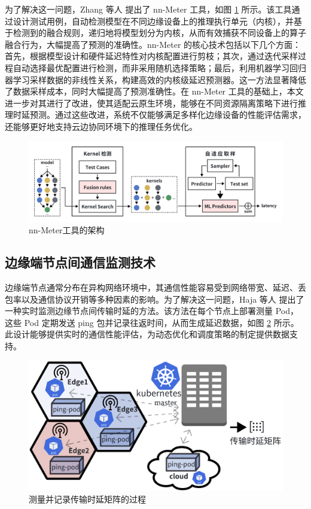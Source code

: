 为了解决这一问题，Zhang 等人\cite{zhang2021nn} 提出了 nn-Meter 工具，如图 \ref{fig:2-5nnmeter} 所示。该工具通过设计测试用例，自动检测模型在不同边缘设备上的推理执行单元（内核），并基于检测到的融合规则，递归地将模型划分为内核，从而有效捕获不同设备上的算子融合行为，大幅提高了预测的准确性。nn-Meter 的核心技术包括以下几个方面：首先，根据模型设计和硬件延迟特性对内核配置进行剪枝；其次，通过迭代采样过程自动选择最优配置进行检测，而非采用随机选择策略；最后，利用机器学习回归器学习采样数据的非线性关系，构建高效的内核级延迟预测器。这一方法显著降低了数据采样成本，同时大幅提高了预测准确性。在 nn-Meter 工具的基础上，本文进一步对其进行了改进，使其适配云原生环境，能够在不同资源隔离策略下进行推理时延预测。通过这些改进，系统不仅能够满足多样化边缘设备的性能评估需求，还能够更好地支持云边协同环境下的推理任务优化。

\begin{figure}[ht]
  \centering
  \includegraphics[width=\linewidth]{pics/2-5nnmeter.png}
  \caption{nn-Meter工具的架构}
  \label{fig:2-5nnmeter}
\end{figure}

\subsection{边缘端节点间通信监测技术}

边缘端节点通常分布在异构网络环境中，其通信性能容易受到网络带宽、延迟、丢包率以及通信协议开销等多种因素的影响。为了解决这一问题，Haja 等人\cite{haja2019sharpening} 提出了一种实时监测边缘节点间传输时延的方法。该方法在每个节点上部署测量 Pod，这些 Pod 定期发送 ping 包并记录往返时间，从而生成延迟数据，如图 \ref{fig:2-6ping} 所示。此设计能够提供实时的通信性能评估，为动态优化和调度策略的制定提供数据支持。

\begin{figure}[ht]
  \centering
  \includegraphics[width=0.7\linewidth]{pics/2-6ping.png}
  \caption{测量并记录传输时延矩阵的过程}
  \label{fig:2-6ping}
\end{figure}

